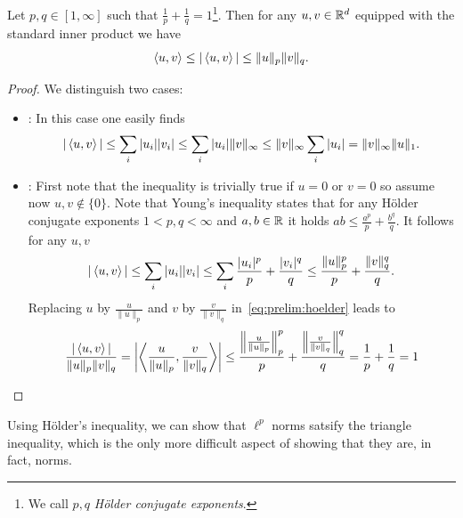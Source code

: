 \begin{theorem}[Hölder]
    Let $p,q\in [1,\infty]$ such that $\frac{1}{p} + \frac{1}{q}=1$\footnote{We call $p,q$ \emph{Hölder conjugate exponents}.}. Then for any $u,v\in \mathbb{R}^d$ equipped with the standard inner product we have
    \begin{equation}
        \left\langle u , v\right\rangle \leq |\left\langle u , v\right\rangle|\leq \|u\|_p \|v\|_q.
    \end{equation}
\end{theorem}
\begin{proof}
    We distinguish two cases:
    \begin{itemize}
        \item {}: In this case one easily finds
        \begin{equation}
            |\left\langle u , v\right\rangle| 
            \leq \sum_i |u_i||v_i|
            \leq\sum_i |u_i|\|v\|_\infty
            \leq\|v\|_\infty\sum_i |u_i| = \|v\|_\infty\|u\|_1.
        \end{equation}
        \item {}: First note that the inequality is trivially true if $u=0$ or $v=0$ so assume now $u,v\notin\{0\}$. Note that Young's inequality states that for any Hölder conjugate exponents $1<p,q<\infty$ and $a,b\in\mathbb{R}$ it holds $ab \leq \frac{a^p}{p} + \frac{b^q}{q}$. It follows for any $u,v$
        \begin{equation}\label{eq:prelim:hoelder}
            |\left\langle u , v\right\rangle| \leq \sum_i |u_i||v_i|\leq \sum_i \frac{|u_i|^p}{p} + \frac{|v_i|^q}{q} \leq \frac{\|u\|_p^p}{p} + \frac{\|v\|_q^q}{q}.
        \end{equation}
        Replacing $u$ by $\frac{u}{\|u\|_p}$ and $v$ by $\frac{v}{\|v\|_q}$ in~\eqref{eq:prelim:hoelder} leads to 
        \begin{equation}
            \begin{aligned}
                \frac{|\left\langle u , v\right\rangle|}{\|u\|_p\|v\|_q} 
                = \left|\left\langle\frac{u}{\|u\|_p} , \frac{v}{\|v\|_q}\right\rangle\right|
                \leq \frac{\left\|\frac{u}{\|u\|_p}\right\|_p^p}{p} + \frac{\left\|\frac{v}{\|v\|_q}\right\|_q^q}{q} 
                = \frac{1}{p} + \frac{1}{q} 
                = 1
            \end{aligned}
        \end{equation}
    \end{itemize}
\end{proof}

Using Hölder's inequality, we can show that $\ell^p$ norms satsify the triangle inequality, which is the only more difficult aspect of showing that they are, in fact, norms.

